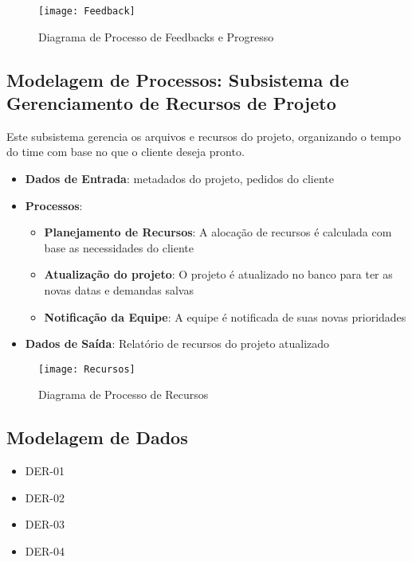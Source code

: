 \begin{figure}[ht]
    \centering
    \texttt{[image: Feedback]}
    \caption{Diagrama de Processo de Feedbacks e Progresso}
    \label{fig:diagram1}
\end{figure}

\pagebreak
\newpage

\subsection{Modelagem de Processos: Subsistema de Gerenciamento de Recursos de Projeto}
Este subsistema gerencia os arquivos e recursos do projeto, organizando o tempo do time com base no que o cliente deseja pronto.

\begin{itemize}
    \item \textbf{Dados de Entrada}: metadados do projeto, pedidos do cliente
    \item \textbf{Processos}:
        \begin{itemize}
            \item \textbf{Planejamento de Recursos}: A alocação de recursos é calculada com base as necessidades do cliente
            \item \textbf{Atualização do projeto}: O projeto é atualizado no banco para ter as novas datas e demandas salvas
            \item \textbf{Notificação da Equipe}: A equipe é notificada de suas novas prioridades
        \end{itemize}
    \item \textbf{Dados de Saída}: Relatório de recursos do projeto atualizado
\end{itemize}

\begin{figure}[ht]
    \centering
    \texttt{[image: Recursos]}
    \caption{Diagrama de Processo de Recursos}
    \label{fig:diagram1}
\end{figure}

\pagebreak
\newpage

\subsection{Modelagem de Dados}

\begin{itemize}
  \item DER-01

  \item DER-02

  \item DER-03

  \item DER-04

\end{itemize}

